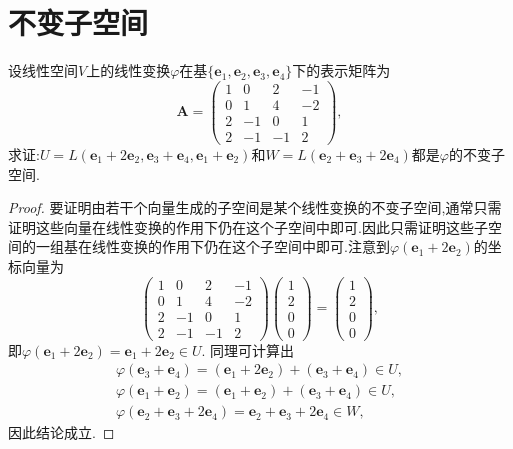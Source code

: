 \documentclass[../../main.tex]{subfiles}%
\begin{document}
\section{不变子空间}

\begin{example}
设线性空间\(V\)上的线性变换\(\varphi\)在基\(\{\boldsymbol{e}_1,\boldsymbol{e}_2,\boldsymbol{e}_3,\boldsymbol{e}_4\}\)下的表示矩阵为
\[
\boldsymbol{A}=\begin{pmatrix}
1&0&2&-1\\
0&1&4&-2\\
2&-1&0&1\\
2&-1&-1&2
\end{pmatrix},
\]
求证:\(U = L(\boldsymbol{e}_1 + 2\boldsymbol{e}_2,\boldsymbol{e}_3 + \boldsymbol{e}_4,\boldsymbol{e}_1 + \boldsymbol{e}_2)\)和\(W = L(\boldsymbol{e}_2 + \boldsymbol{e}_3 + 2\boldsymbol{e}_4)\)都是\(\varphi\)的不变子空间.
\end{example}
\begin{proof}

要证明由若干个向量生成的子空间是某个线性变换的不变子空间,通常只需证明这些向量在线性变换的作用下仍在这个子空间中即可.因此只需证明这些子空间的一组基在线性变换的作用下仍在这个子空间中即可.注意到\(\varphi(\boldsymbol{e}_1 + 2\boldsymbol{e}_2)\)的坐标向量为
\[
\begin{pmatrix}
1&0&2&-1\\
0&1&4&-2\\
2&-1&0&1\\
2&-1&-1&2
\end{pmatrix}
\begin{pmatrix}
1\\
2\\
0\\
0
\end{pmatrix}=
\begin{pmatrix}
1\\
2\\
0\\
0
\end{pmatrix},
\]
即\(\varphi(\boldsymbol{e}_1 + 2\boldsymbol{e}_2)=\boldsymbol{e}_1 + 2\boldsymbol{e}_2\in U\). 同理可计算出
\begin{gather*}
\varphi(\boldsymbol{e}_3 + \boldsymbol{e}_4)=(\boldsymbol{e}_1 + 2\boldsymbol{e}_2)+(\boldsymbol{e}_3 + \boldsymbol{e}_4)\in U,\\
\varphi(\boldsymbol{e}_1 + \boldsymbol{e}_2)=(\boldsymbol{e}_1 + \boldsymbol{e}_2)+(\boldsymbol{e}_3 + \boldsymbol{e}_4)\in U,\\
\varphi(\boldsymbol{e}_2 + \boldsymbol{e}_3 + 2\boldsymbol{e}_4)=\boldsymbol{e}_2 + \boldsymbol{e}_3 + 2\boldsymbol{e}_4\in W,
\end{gather*}
因此结论成立. 

\end{proof}
\end{document}
